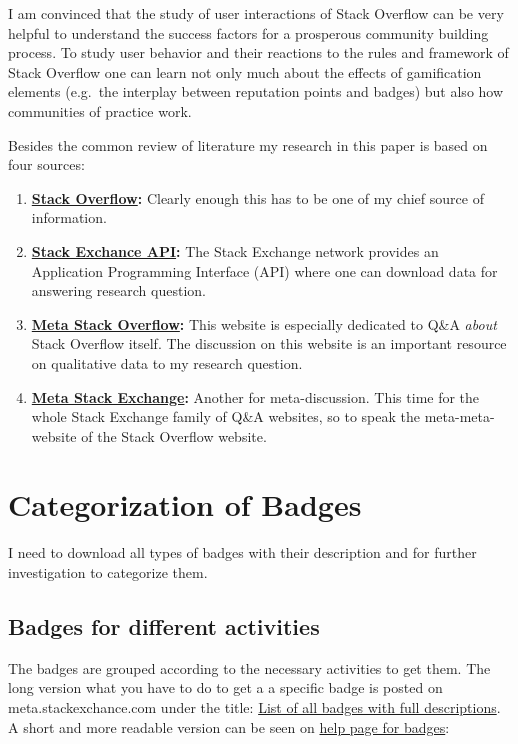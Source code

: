 \documentclass[]{book}
\providecommand{\tightlist}{%
  \setlength{\itemsep}{0pt}\setlength{\parskip}{0pt}}
\theoremstyle{definition}
\theoremstyle{definition}
\theoremstyle{definition}
\theoremstyle{remark}
\begin{document}
I am convinced that the study of user interactions of Stack Overflow can
be very helpful to understand the success factors for a prosperous
community building process. To study user behavior and their reactions
to the rules and framework of Stack Overflow one can learn not only much
about the effects of gamification elements (e.g.~the interplay between
reputation points and badges) but also how communities of practice work.

Besides the common review of literature my research in this paper is
based on four sources:

\begin{enumerate}
\def\labelenumi{\arabic{enumi}.}
\tightlist
\item
  \textbf{\href{https://stackoverflow.com/}{Stack Overflow}:} Clearly
  enough this has to be one of my chief source of information.
\item
  \textbf{\href{http://api.stackexchange.com/}{Stack Exchance API}:} The
  Stack Exchange network provides an Application Programming Interface
  (API) where one can download data for answering research question.
\item
  \textbf{\href{https://meta.stackoverflow.com/}{Meta Stack Overflow}:}
  This website is especially dedicated to Q\&A \emph{about} Stack
  Overflow itself. The discussion on this website is an important
  resource on qualitative data to my research question.
\item
  \textbf{\href{https://meta.stackexchange.com/}{Meta Stack Exchange}:}
  Another for meta-discussion. This time for the whole Stack Exchange
  family of Q\&A websites, so to speak the meta-meta-website of the
  Stack Overflow website.
\end{enumerate}

\section{Categorization of Badges}\label{categorization-of-badges}

I need to download all types of badges with their description and for
further investigation to categorize them.

\subsection{Badges for different
activities}\label{badges-for-different-activities}

The badges are grouped according to the necessary activities to get
them. The long version what you have to do to get a a specific badge is
posted on meta.stackexchance.com under the title:
\href{https://meta.stackexchange.com/questions/67397/list-of-all-badges-with-full-descriptions}{List
of all badges with full descriptions}. A short and more readable version
can be seen on \href{https://stackoverflow.com/help/badges}{help page
for badges}:
\end{document}
